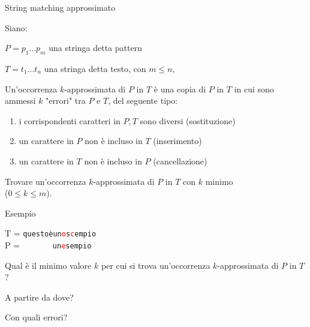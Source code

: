 \begin{frame}{String matching approssimato}

\vspace{-6pt}
\begin{myboxtitle}[Definizione]

Siano:
\BI
\item $P = p_1 \ldots p_m$ una stringa detta \alert{pattern}
\item $T = t_1 \ldots t_n$ una stringa detta \alert{testo}, con $m \leq n$,
\EI

Un'\alert{occorrenza $k$-approssimata} di $P$ in $T$ è una copia di $P$ in $T$ in cui sono ammessi $k$ "errori" tra $P$ e $T$, del seguente tipo:
\begin{enumerate}
\item i corrispondenti caratteri in $P, T$ sono diversi (\alert{sostituzione}) 
\item un carattere in $P$ non è incluso in $T$ (\alert{inserimento})
\item un carattere in $T$ non è incluso in $P$ (\alert{cancellazione})
\end{enumerate}
\end{myboxtitle}

\begin{myboxtitle}
Trovare un'occorrenza $k$-approssimata di $P$ in $T$ con $k$ minimo\\ 
($0 \leq k \leq m$).
\end{myboxtitle}

\end{frame}

\begin{frame}{Esempio}

\vspace{-6pt}
\begin{myboxtitle}[Esempio]
T = \texttt{questoèun\textcolor{red}{o}s\textcolor{red}{c}empio} \\
P = \texttt{~~~~~~~un\textcolor{red}{e}sempio}
\end{myboxtitle}

\begin{myboxtitle}[Domande]
\BIL
\item Qual è il minimo valore $k$ per cui si trova un'occorrenza $k$-approssimata di $P$ in $T$?
\item A partire da dove?
\item Con quali errori?
\EIL
\end{myboxtitle}

\end{frame}

